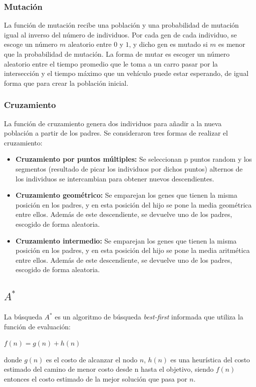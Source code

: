 \documentclass[colorinlistoftodos,twoside,twocolumn]{article} %
\begin{document}
	\subsubsection{Mutación}
	
	La funci\'on de mutaci\'on recibe una poblaci\'on y una probabilidad de mutaci\'on igual al inverso del n\'umero de individuos. Por cada gen de cada individuo, se escoge un n\'umero $ m $ aleatorio entre $ 0 $ y $ 1 $, y dicho gen es mutado si $ m $ es menor que la probabilidad de mutaci\'on. La forma de mutar es escoger un n\'umero aleatorio entre el tiempo promedio que le toma a un carro pasar por la intersección y el tiempo máximo que un vehículo puede estar esperando, de igual forma que para crear la poblaci\'on inicial.
	
	\subsubsection{Cruzamiento}
	
	La funci\'on de cruzamiento genera dos individuos para a\~nadir a la nueva poblaci\'on a partir de los padres. Se consideraron tres formas de realizar el cruzamiento:
	\begin{itemize}
		\item  \textbf{Cruzamiento por puntos m\'ultiples:} Se seleccionan p puntos random y los segmentos (resultado de picar los individuos por dichos puntos) alternos de los individuos se intercambian para obtener nuevos descendientes.
		\item \textbf{Cruzamiento geom\'etrico:} Se emparejan los genes que tienen la misma posici\'on en los padres, y en esta posici\'on del hijo se pone la media geom\'etrica entre ellos. Adem\'as de este descendiente, se devuelve uno de los padres, escogido de forma aleatoria.   
		\item \textbf{Cruzamiento intermedio:} Se emparejan los genes que tienen la misma posici\'on en los padres, y en esta posici\'on del hijo se pone la media aritm\'etica entre ellos. Adem\'as de este descendiente, se devuelve uno de los padres, escogido de forma aleatoria. 
	\end{itemize}
	
	\subsection{$ A^{*} $}
	
	La b\'usqueda $ A^{*} $ es un algoritmo de búsqueda \textit{best-first} informada que utiliza la función de evaluación:
	\begin{center}
		$ f(n) = g(n) + h(n) $
	\end{center}
	donde $ g(n) $ es el costo de alcanzar el nodo $ n $, $ h(n) $ es una heur\'istica del costo estimado del camino de menor costo desde n hasta el objetivo, siendo $ f(n) $ entonces el costo estimado de la mejor soluci\'on que pasa por $ n $.
	
\end{document}
